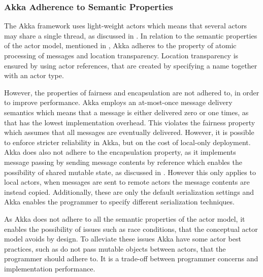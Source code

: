 \subsubsection{Akka Adherence to Semantic Properties}
The Akka framework uses light-weight actors which means that several actors may share a single thread\cite[p. 13]{akkaDoc}, as discussed in . 
In relation to the semantic properties of the actor model, mentioned in , Akka adheres to the property of atomic processing of messages and location transparency. Location transparency is ensured by using actor references, that are created by specifying a name together with an actor type\cite[p. 24]{akkaDoc}. 

However, the properties of fairness and encapsulation are not adhered to, in order to improve performance. Akka employs an at-most-once message delivery semantics which means that a message is either delivered zero or one times, as that has the lowest implementation overhead\cite[p. 27]{akkaDoc}. This violates the fairness property which assumes that all messages are eventually delivered. However, it is possible to enforce stricter reliability in Akka, but on the cost of local-only deployment\cite[p. 29]{akkaDoc}. Akka does also not adhere to the encapsulation property, as it implements message passing by sending message contents by reference which enables the possibility of shared mutable state, as discussed in . However this only applies to local actors, when messages are sent to remote actors the message contents are instead copied. Additionally, these are only the default serialization settings and Akka enables the programmer to specify different serialization techniques\cite[p. 219]{akkaDoc}.

As Akka does not adhere to all the semantic properties of the actor model, it enables the possibility of issues such as race conditions, that the conceptual actor model avoids by design. To alleviate these issues Akka have some actor best practices, such as do not pass mutable objects between actors, that the programmer should adhere to\cite[p. 12]{akkaDoc}. It is a trade-off between programmer concerns and implementation performance.


